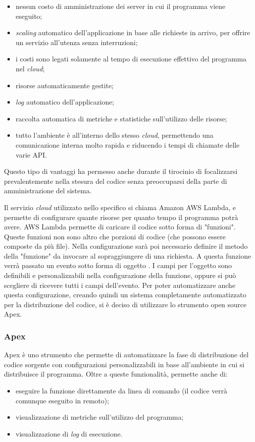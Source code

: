 \begin{itemize}

  \item nessun costo di amministrazione dei server in cui il programma viene
eseguito;
  \item \textit{scaling} automatico dell'applicazione in base alle richieste in
arrivo, per offrire un servizio all'utenza senza interruzioni;
  \item i costi sono legati solamente al tempo di esecuzione effettivo del
programma nel \textit{cloud};
  \item risorse automaticamente gestite;
  \item \textit{log} automatico dell'applicazione;
  \item raccolta automatica di metriche e statistiche sull'utilizzo delle
risorse;
  \item tutto l'ambiente è all'interno dello stesso \textit{cloud}, permettendo
una comunicazione interna molto rapida e riducendo i tempi di chiamate delle
varie API.
\end{itemize}

Questo tipo di vantaggi ha permesso anche durante il tirocinio di focalizzarsi
prevalentemente nella stesura del codice senza preoccuparsi della parte di
amministrazione del sistema.

Il servizio \textit{cloud} utilizzato nello specifico si chiama Amazon AWS
Lambda, e permette di configurare quante risorse per quanto tempo il programma
potrà avere.
AWS Lambda permette di caricare il codice sotto forma di "funzioni". Queste
funzioni non sono altro che porzioni di codice (che possono essere composte da
più file).
Nella configurazione sarà poi necessario definire il metodo della
"funzione" da invocare al sopraggiungere di una richiesta. A questa funzione
verrà passato un evento sotto forma di oggetto
. I campi per l'oggetto sono
definibili e personalizzabili nella configurazione della funzione, oppure si può
scegliere di ricevere tutti i campi dell'evento.
Per poter automatizzare anche questa configurazione, creando
quindi un sistema completamente automatizzato per la distribuzione del
codice, si è deciso di utilizzare lo strumento open source Apex.

\subsubsection{Apex}
Apex è uno strumento che permette di automatizzare la fase di distribuzione del
codice sorgente con configurazioni personalizzabili in base all'ambiente in cui
si distribuisce il programma. Oltre a queste funzionalità, permette anche di:
\begin{itemize}
  \item eseguire la funzione direttamente da linea di comando (il codice verrà
comunque eseguito in remoto);
  \item visualizzazione di metriche sull'utilizzo del programma;
  \item visualizzazione di \textit{log} di esecuzione.
\end{itemize}

